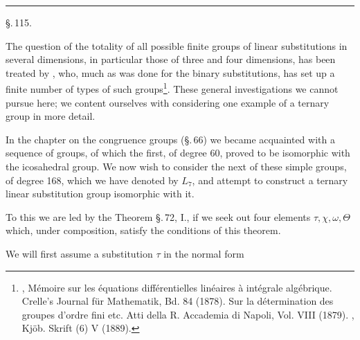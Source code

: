 
\begin{center}


\rule{0.3\linewidth}{0.4pt}

\S.\,115.

\end{center}

The question of the totality of all possible finite groups of
linear substitutions in several dimensions, in particular those of
three and four dimensions, has been treated by ,
who, much as was done for the binary substitutions, has set up a
finite number of types of such groups\footnote{, Mémoire sur les équations différentielles linéaires à
intégrale algébrique. Crelle's Journal für Mathematik, Bd. 84 (1878). Sur
la détermination des groupes d'ordre fini etc. Atti della R. Accademia di
Napoli, Vol. VIII (1879). , Kj\"ob. Skrift (6) V (1889).}. These general investigations
we cannot pursue here; we content ourselves with considering one
example of a ternary group in more detail.

In the chapter on the congruence groups (\S.\,66) we became
acquainted with a sequence of  groups, of which the first,
of degree 60, proved to be isomorphic with the icosahedral group.
We now wish to consider the next of these simple groups, of
degree 168, which we have denoted by $L_7$, and attempt to
construct a ternary linear substitution group isomorphic with it.

To this we are led by the Theorem \S.\,72, I., if we seek out
four elements $\tau, \chi, \omega, \Theta$ which, under composition, satisfy the
conditions of this theorem.

We will first assume a substitution $\tau$ in the normal form
